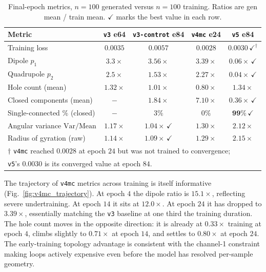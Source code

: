 \documentclass[11pt]{article}
\begin{document}
\begin{table}[H]
\centering
\caption{Final-epoch metrics, $n = 100$ generated versus $n = 100$ training. Ratios are gen mean / train mean. $\checkmark$ marks the best value in each row.}
\label{tab:headline}
\begin{tabular}{lcccc}
\toprule
Metric & \texttt{v3} e64 & \texttt{v3-controt} e84 & \texttt{v4mc} e24 & \texttt{v5} e84 \\
\midrule
Training loss & $0.0035$ & $0.0057$ & $0.0028$ & $\mathbf{0.0030}\,\checkmark^\dagger$ \\
Dipole $p_1$ & $3.3\times$ & $3.56\times$ & $3.39\times$ & $\mathbf{0.06\times}\,\checkmark$ \\
Quadrupole $p_2$ & $2.5\times$ & $1.53\times$ & $2.27\times$ & $\mathbf{0.04\times}\,\checkmark$ \\
Hole count (mean) & $1.32\times$ & $1.01\times$ & $0.80\times$ & $1.34\times$ \\
Closed components (mean) & $-$ & $1.84\times$ & $7.10\times$ & $\mathbf{0.36\times}\,\checkmark$ \\
Single-connected $\%$ (closed) & $-$ & $3\%$ & $0\%$ & $\mathbf{99\%}\,\checkmark$ \\
Angular variance $\mathrm{Var}/\mathrm{Mean}$ & $1.17\times$ & $\mathbf{1.04\times}\,\checkmark$ & $1.30\times$ & $2.12\times$ \\
Radius of gyration (raw) & $1.14\times$ & $\mathbf{1.09\times}\,\checkmark$ & $1.29\times$ & $2.15\times$ \\
\bottomrule
\multicolumn{5}{l}{\footnotesize $\dagger$ \texttt{v4mc} reached $0.0028$ at epoch $24$ but was not trained to convergence;}\\
\multicolumn{5}{l}{\footnotesize \texttt{v5}'s $0.0030$ is its converged value at epoch $84$.}
\end{tabular}
\end{table}

The trajectory of \texttt{v4mc} metrics across training is itself informative (Fig.~\ref{fig:v4mc_trajectory}). At epoch $4$ the dipole ratio is $15.1\times$, reflecting severe undertraining. At epoch $14$ it sits at $12.0\times$. At epoch $24$ it has dropped to $3.39\times$, essentially matching the \texttt{v3} baseline at one third the training duration. The hole count moves in the opposite direction: it is already at $0.33\times$ training at epoch $4$, climbs slightly to $0.71\times$ at epoch $14$, and settles to $0.80\times$ at epoch $24$. The early-training topology advantage is consistent with the channel-1 constraint making loops actively expensive even before the model has resolved per-sample geometry.
\end{document}
